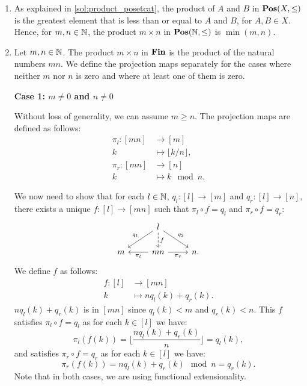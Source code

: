 \begin{solution}\label{sol:product_cats_of_nats}
	\begin{enumerate}
		\item As explained in \cref{sol:product_posetcat}, the product of $A$ and $B$ in $\mathbf{Pos}(X,\leq)$ is the greatest element that is less than or equal to $A$ and $B$, for $A,B \in X$.
		Hence, for $m,n \in \mathbb{N}$, the product $m \times n$ in $\mathbf{Pos}(\mathbb{N},\leq)$ is $\min(m,n)$.
		\item Let $m,n \in \mathbb{N}$. The product $m \times n$ in $\mathbf{Fin}$ is the product of the natural numbers $mn$. We define the projection maps separately for the cases where neither $m$ nor $n$ is zero and where at least one of them is zero. 
		
		\textbf{Case 1: $m\neq 0$ and $n \neq 0$} 
		
		Without loss of generality, we can assume $m \geq n$. The projection maps are defined as follows: 
		\begin{align*}
			\pi_l : [mn] &\to [m] \\
			k &\mapsto \lfloor k / n \rfloor, \\
			\pi_r : [mn] &\to [n] \\
			k &\mapsto k \mod n.
		\end{align*}

		We now need to show that for each $l \in \mathbb{N}$, $q_l : [l] \to [m]$ and $q_r : [l] \to [n]$, there exists a unique $f : [l] \to [mn]$ such that $\pi_l \circ f = q_l$ and $\pi_r \circ f = q_r$:
		\[
			\begin{tikzcd}
			  &
			  l \ar[ld, "q_1"'] \ar[rd, "q_2"] \ar[d, dashed, "f"]
			  &
			  \\
			  m
			  &
			  mn \ar[l, "\projl"] \ar[r, "\projr"']
			  &
			  n.
			\end{tikzcd}
	    \]
		We define $f$ as follows: 
		\begin{align*}
			f : [l] &\to  [mn] \\
			k & \mapsto n q_l (k) + q_r(k).
		\end{align*}	
		$n q_l (k) + q_r(k)$ is in $[mn]$ since $q_l(k) < m$ and $q_r(k) < n$. This $f$ satisfies $\pi_l \circ f = q_l$ as for each $k \in [l]$ we have:
		\[ \pi_l (f(k)) = \lfloor \frac{n q_l(k) + q_r(k)}{n} \rfloor = q_l(k), \]
		and satisfies $\pi_r \circ f = q_r$ as for each $k \in [l]$ we have: 
		\[ \pi_r(f(k)) = n q_l(k) + q_r(k) \mod n = q_r(k). \] 
		Note that in both cases, we are using functional extensionality.


\end{enumerate}
\end{solution}
